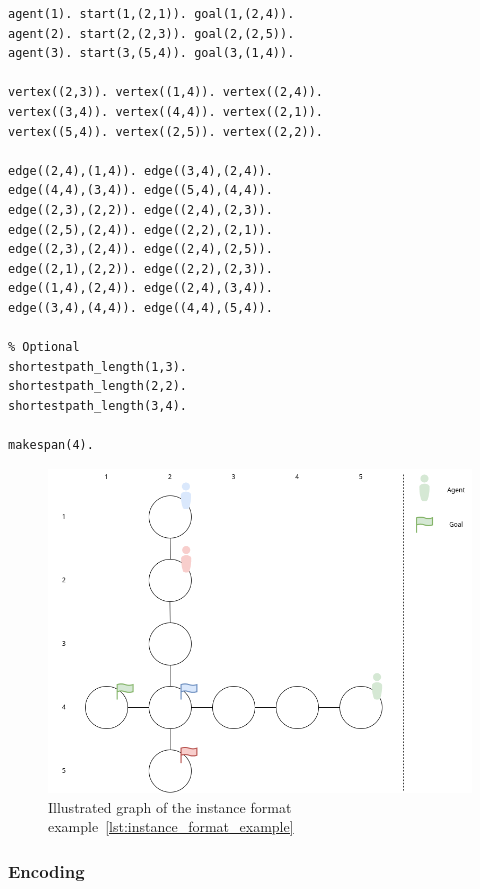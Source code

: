 \begin{minipage}[H]{\linewidth}
\begin{lstlisting}[style=mystyle, caption={Example of instance format}, label={lst:instance_format_example}]
agent(1). start(1,(2,1)). goal(1,(2,4)).
agent(2). start(2,(2,3)). goal(2,(2,5)).
agent(3). start(3,(5,4)). goal(3,(1,4)).

vertex((2,3)). vertex((1,4)). vertex((2,4)).
vertex((3,4)). vertex((4,4)). vertex((2,1)).
vertex((5,4)). vertex((2,5)). vertex((2,2)).

edge((2,4),(1,4)). edge((3,4),(2,4)).
edge((4,4),(3,4)). edge((5,4),(4,4)).
edge((2,3),(2,2)). edge((2,4),(2,3)).
edge((2,5),(2,4)). edge((2,2),(2,1)).
edge((2,3),(2,4)). edge((2,4),(2,5)).
edge((2,1),(2,2)). edge((2,2),(2,3)).
edge((1,4),(2,4)). edge((2,4),(3,4)).
edge((3,4),(4,4)). edge((4,4),(5,4)).

% Optional 
shortestpath_length(1,3).
shortestpath_length(2,2).
shortestpath_length(3,4).

makespan(4).
\end{lstlisting}
\end{minipage}


\begin{figure}[H]
    \centering
    \caption{Illustrated graph of the instance format example~\ref{lst:instance_format_example}}\label{fig:illustrated_instance_format_example}
    \includegraphics[width=\widthimg]{img/illustrated_instance_format_example.drawio.png}
\end{figure}


\subsubsection{Encoding}

